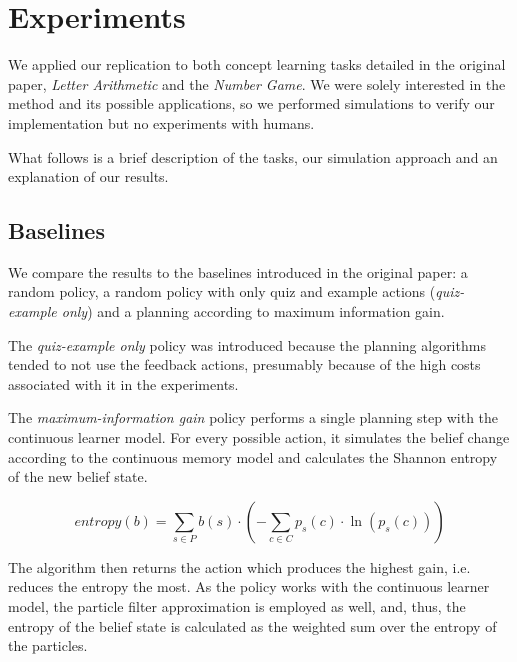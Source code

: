 
\section{Experiments}
We applied our replication to both concept learning tasks detailed in the original paper, \textit{Letter Arithmetic} and the \textit{Number Game}. We were solely interested in the method and its possible applications, so we performed simulations to verify our implementation but no experiments with humans.

What follows is a brief description of the tasks, our simulation approach and an explanation of our results.

\subsection{Baselines}

We compare the results to the baselines introduced in the original paper: a random policy, a random policy with only quiz and example actions (\textit{quiz-example only}) and a planning according to maximum information gain.

The \textit{quiz-example only} policy was introduced because the planning algorithms tended to not use the feedback actions, presumably because of the high costs associated with it in the experiments.

The \textit{maximum-information gain} policy performs a single planning step with the continuous learner model. For every possible action, it simulates the belief change according to the continuous memory model and calculates the Shannon entropy
of the new belief state.

\begin{equation}
    entropy(b)=\sum_{s \in P}{b(s)} \cdot \left( -\sum_{c \in C}{p_s(c)\cdot \ln\left( p_s(c) \right)} \right)
\end{equation}

The algorithm then returns the action which produces the highest gain, i.e. reduces the entropy the most.
As the policy works with the continuous learner model, the particle filter approximation is employed as well, and, thus, the entropy of the belief state is calculated as the weighted sum over the entropy of the particles.

